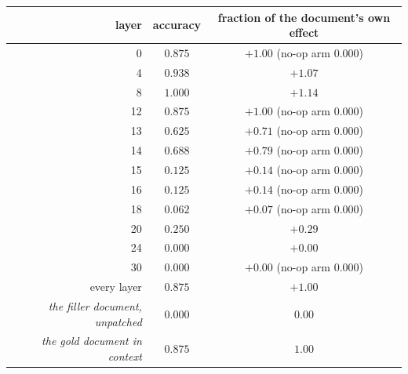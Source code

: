 \begin{tabular}{@{}rcc@{}}
\toprule
\rowcolor{TableHeader}
layer & accuracy & fraction of the document's own effect \\
\midrule
0 & $0.875$ & $+1.00$ \quad\tiny(no-op arm 0.000) \\
4 & $0.938$ & $+1.07$ \\
8 & $1.000$ & $+1.14$ \\
12 & $0.875$ & $+1.00$ \quad\tiny(no-op arm 0.000) \\
13 & $0.625$ & $+0.71$ \quad\tiny(no-op arm 0.000) \\
14 & $0.688$ & $+0.79$ \quad\tiny(no-op arm 0.000) \\
15 & $0.125$ & $+0.14$ \quad\tiny(no-op arm 0.000) \\
16 & $0.125$ & $+0.14$ \quad\tiny(no-op arm 0.000) \\
18 & $0.062$ & $+0.07$ \quad\tiny(no-op arm 0.000) \\
20 & $0.250$ & $+0.29$ \\
24 & $0.000$ & $+0.00$ \\
30 & $0.000$ & $+0.00$ \quad\tiny(no-op arm 0.000) \\
\midrule
every layer & $0.875$ & $+1.00$ \\
\midrule
\emph{the filler document, unpatched} & $0.000$ & $0.00$ \\
\emph{the gold document in context} & $0.875$ & $1.00$ \\
\bottomrule
\end{tabular}
